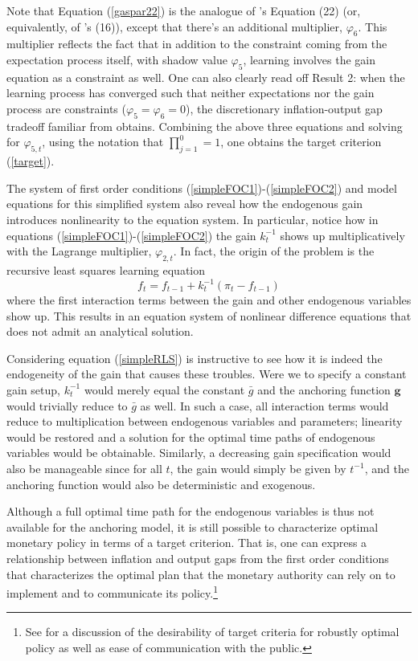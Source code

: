 \documentclass[11pt]{article}
\renewcommand{\[}{\begin{equation}}
\renewcommand{\]}{\end{equation}}
\begin{document}
Note that Equation (\ref{gaspar22}) is the analogue of \cite{gaspar2010inflation}'s Equation (22) (or, equivalently, of  \cite{molnar2014optimal}'s (16)), except that there's an additional multiplier, $\varphi_6$. This multiplier reflects the fact that in addition to the constraint coming from the expectation process itself, with shadow value $\varphi_5$, learning involves the gain equation as a constraint as well. One can also clearly read off Result 2: when the learning process has converged such that neither expectations nor the gain process are constraints ($\varphi_5 =\varphi_6 = 0$), the discretionary inflation-output gap tradeoff familiar from \cite{clarida1999science} obtains. Combining the above three equations and solving for $\varphi_{5,t}$, using the notation that $\prod_{j=1}^{0} = 1$, one obtains the target criterion (\ref{target}).

The system of first order conditions (\ref{simpleFOC1})-(\ref{simpleFOC2}) and model equations for this simplified system also reveal how the endogenous gain introduces nonlinearity to the equation system. In particular, notice how in equations (\ref{simpleFOC1})-(\ref{simpleFOC2}) the gain $k_t^{-1}$ shows up multiplicatively with the Lagrange multiplier, $\varphi_{2,t}$. In fact, the origin of the problem is the recursive least squares learning equation
\begin{equation}
f_t = f_{t-1} + k_t^{-1}(\pi_t - f_{t-1}) \label{simpleRLS}
\end{equation}
where the first interaction terms between the gain and other endogenous variables show up. This results in an equation system of nonlinear difference equations that does not admit an analytical solution. 

Considering equation (\ref{simpleRLS}) is instructive to see how it is indeed the endogeneity of the gain that causes these troubles. Were we to specify a constant gain setup, $k_t^{-1}$ would merely equal the constant $\bar{g}$ and the anchoring function $\mathbf{g}$ would trivially reduce to $\bar{g}$ as well. In such a case, all interaction terms would reduce to multiplication between endogenous variables and parameters; linearity would be restored and a solution for the optimal time paths of endogenous variables would be obtainable. Similarly, a decreasing gain specification would also be manageable since for all $t$, the gain would simply be given by $t^{-1}$, and the anchoring function would also be deterministic and exogenous. 

Although a full optimal time path for the endogenous variables is thus not available for the anchoring model, it is still possible to characterize optimal monetary policy in terms of a target criterion. That is, one can express a relationship between inflation and output gaps from the first order conditions that characterizes the optimal plan that the monetary authority can rely on to implement and to communicate its policy.\footnote{See \cite{woodford2011interest} for a discussion of the desirability of target criteria for robustly optimal policy as well as ease of communication with the public.}
\end{document}
